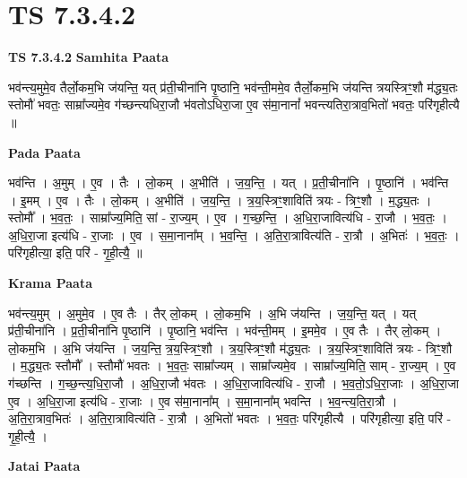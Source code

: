 \documentclass[17pt]{extarticle}
\begin{document}
\section{ TS 7.3.4.2 }

\textbf{TS 7.3.4.2 } \newline
\textbf{Samhita Paata} \newline

भव॑न्त्य॒मुमे॒व तैर्लो॒कम॒भि ज॑यन्ति॒ यत् प्र॑ती॒चीना॑नि पृ॒ष्ठानि॒ भव॑न्ती॒ममे॒व तैर्लो॒कम॒भि ज॑यन्ति त्रयस्त्रिꣳ॒॒शौ म॑द्ध्य॒तः स्तोमौ॑ भवतः॒ साम्रा᳚ज्यमे॒व ग॑च्छन्त्यधिरा॒जौ भ॑वतोऽधिरा॒जा ए॒व स॑मा॒नानां᳚ भवन्त्यतिरा॒त्राव॒भितो॑ भवतः॒ परि॑गृहीत्यै ॥ \newline

\textbf{Pada Paata} \newline

भव॑न्ति । अ॒मुम् । ए॒व । तैः । लो॒कम् । अ॒भीति॑ । ज॒य॒न्ति॒ । यत् । प्र॒ती॒चीना॑नि । पृ॒ष्ठानि॑ । भव॑न्ति । इ॒मम् । ए॒व । तैः । लो॒कम् । अ॒भीति॑ । ज॒य॒न्ति॒ । त्र॒य॒स्त्रिꣳ॒॒शाविति॑ त्रयः - त्रिꣳ॒॒शौ । म॒द्ध्य॒तः । स्तोमौ᳚ । भ॒व॒तः॒ । साम्रा᳚ज्य॒मिति॒ सां - रा॒ज्य॒म् । ए॒व । ग॒च्छ॒न्ति॒ । अ॒धि॒रा॒जावित्य॑धि - रा॒जौ । भ॒व॒तः॒ । अ॒धि॒रा॒जा इत्य॑धि - रा॒जाः । ए॒व । स॒मा॒नाना᳚म् । भ॒व॒न्ति॒ । अ॒ति॒रा॒त्रावित्य॑ति - रा॒त्रौ । अ॒भितः॑ । भ॒व॒तः॒ । परि॑गृहीत्या॒ इति॒ परि॑ - गृ॒ही॒त्यै॒ ॥  \newline


\textbf{Krama Paata} \newline

भव॑न्त्य॒मुम् । अ॒मुमे॒व । ए॒व तैः । तैर् लो॒कम् । लो॒कम॒भि । अ॒भि ज॑यन्ति । ज॒य॒न्ति॒ यत् । यत् प्र॑ती॒चीना॑नि । प्र॒ती॒चीना॑नि पृ॒ष्ठानि॑ । पृ॒ष्ठानि॒ भव॑न्ति । भव॑न्ती॒मम् । इ॒ममे॒व । ए॒व तैः । तैर् लो॒कम् । लो॒कम॒भि । अ॒भि ज॑यन्ति । ज॒य॒न्ति॒ त्र॒य॒स्त्रिꣳ॒॒शौ । त्र॒य॒स्त्रिꣳ॒॒शौ म॑द्ध्य॒तः । त्र॒य॒स्त्रिꣳ॒॒शाविति॑ त्रयः - त्रिꣳ॒॒शौ । म॒द्ध्य॒तः स्तौमौ᳚ । स्तौमौ॑ भवतः । भ॒व॒तः॒ साम्रा᳚ज्यम् । साम्रा᳚ज्यमे॒व । साम्रा᳚ज्य॒मिति॒ साम् - रा॒ज्य॒म् । ए॒व ग॑च्छन्ति । ग॒च्छ॒न्त्य॒धि॒रा॒जौ । अ॒धि॒रा॒जौ भ॑वतः । अ॒धि॒रा॒जावित्य॑धि - रा॒जौ । भ॒व॒तो॒ऽधि॒रा॒जाः । अ॒धि॒रा॒जा ए॒व । अ॒धि॒रा॒जा इत्य॑धि - रा॒जाः । ए॒व स॑मा॒नाना᳚म् । स॒मा॒नाना᳚म् भवन्ति । भ॒व॒न्त्य॒ति॒रा॒त्रौ । अ॒ति॒रा॒त्राव॒भितः॑ । अ॒ति॒रा॒त्रावित्य॑ति - रा॒त्रौ । अ॒भितो॑ भवतः । भ॒व॒तः॒ परि॑गृहीत्यै । परि॑गृहीत्या॒ इति॒ परि॑ - गृ॒ही॒त्यै॒ । \newline

\textbf{Jatai Paata} \newline
\end{document}
